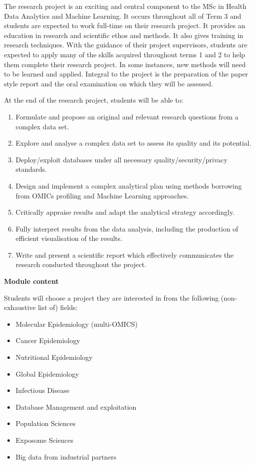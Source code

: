 \documentclass[
]{book}
\providecommand{\tightlist}{%
  \setlength{\itemsep}{0pt}\setlength{\parskip}{0pt}}
\begin{document}
The research project is an exciting and central component to the MSc in Health Data Analytics and Machine Learning. It occurs throughout all of Term 3 and students are expected to work full-time on their research project. It provides an education in research and scientific ethos and methods. It also gives training in research techniques. With the guidance of their project supervisors, students are expected to apply many of the skills acquired throughout terms 1 and 2 to help them complete their research project. In some instances, new methods will need to be learned and applied. Integral to the project is the preparation of the paper style report and the oral examination on which they will be assessed.

At the end of the research project, students will be able to:

\begin{enumerate}
\def\labelenumi{\arabic{enumi}.}
\tightlist
\item
  Formulate and propose an original and relevant research questions from a complex data set.
\item
  Explore and analyse a complex data set to assess its quality and its potential.
\item
  Deploy/exploit databases under all necessary quality/security/privacy standards.
\item
  Design and implement a complex analytical plan using methods borrowing from OMICs profiling and Machine Learning approaches.
\item
  Critically appraise results and adapt the analytical strategy accordingly.
\item
  Fully interpret results from the data analysis, including the production of efficient visualisation of the results.
\item
  Write and present a scientific report which effectively communicates the research conducted throughout the project.
\end{enumerate}

\textbf{Module content}

Students will choose a project they are interested in from the following (non-exhaustive list of) fields:

\begin{itemize}
\tightlist
\item
  Molecular Epidemiology (multi-OMICS)
\item
  Cancer Epidemiology
\item
  Nutritional Epidemiology
\item
  Global Epidemiology
\item
  Infectious Disease
\item
  Database Management and exploitation
\item
  Population Sciences
\item
  Exposome Sciences
\item
  Big data from industrial partners
\end{itemize}
\end{document}
